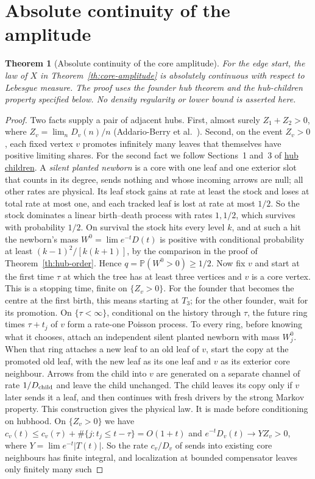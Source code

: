 \documentclass[11pt]{article}
\newcommand{\proofsrc}[2]{\href{https://github.com/uzay-eth/friend-tree-exponent/blob/a0972085ad72ad5685ae7b424988648d1965e73c/#1}{#2}}
\newtheorem{theorem}{Theorem}
\newcommand{\resulttag}{?}
\newcommand{\tagnext}[1]{\renewcommand{\resulttag}{#1}}
\theoremstyle{remark}
\numberwithin{equation}{section}
\newcommand{\Prob}{\mathbb P}
\begin{document}
\section{Absolute continuity of the amplitude}\label{sec:core-den}
\tagnext{DEN}
\begin{theorem}[Absolute continuity of the core amplitude]\label{th:core-density}
For the edge start, the law of $X$ in Theorem~\ref{th:core-amplitude} is absolutely continuous with respect to Lebesgue measure. The proof uses the founder hub theorem and the hub-children property specified below. No density regularity or lower bound is asserted here.
\end{theorem}
\begin{proof}
Two facts supply a pair of adjacent hubs. First, almost surely $Z_1+Z_2>0$, where $Z_v=\lim_n D_v(n)/n$ (Addario-Berry et al.~\cite[Theorem~3.2 at the founder edge, arXiv v1; see Theorem~3.1 for the degree limits]{AB}). Second, on the event $Z_v>0$, each fixed vertex $v$ promotes infinitely many leaves that themselves have positive limiting shares. For the second fact we follow Sections~1 and~3 of \proofsrc{round2/proofs/astra/source/round2/fringe/hub-children.md}{hub children}. A \emph{silent planted newborn} is a core with one leaf and one exterior slot that counts in its degree, sends nothing and whose incoming arrows are null; all other rates are physical. Its leaf stock gains at rate at least the stock and loses at total rate at most one, and each tracked leaf is lost at rate at most $1/2$. So the stock dominates a linear birth--death process with rates $1,1/2$, which survives with probability $1/2$. On survival the stock hits every level $k$, and at such a hit the newborn's mass $W^0=\lim e^{-t}D(t)$ is positive with conditional probability at least $(k-1)^2/[k(k+1)]$, by the comparison in the proof of Theorem~\ref{th:hub-order}. Hence $q=\Prob(W^0>0)\ge1/2$. Now fix $v$ and start at the first time $\tau$ at which the tree has at least three vertices and $v$ is a core vertex. This is a stopping time, finite on $\{Z_v>0\}$. For the founder that becomes the centre at the first birth, this means starting at $T_3$; for the other founder, wait for its promotion. On $\{\tau<\infty\}$, conditional on the history through $\tau$, the future ring times $\tau+t_j$ of $v$ form a rate-one Poisson process. To every ring, before knowing what it chooses, attach an independent silent planted newborn with mass $W^0_j$. When that ring attaches a new leaf to an old leaf of $v$, start the copy at the promoted old leaf, with the new leaf as its one leaf and $v$ as its exterior core neighbour. Arrows from the child into $v$ are generated on a separate channel of rate $1/D_{\rm child}$ and leave the child unchanged. The child leaves its copy only if $v$ later sends it a leaf, and then continues with fresh drivers by the strong Markov property. This construction gives the physical law. It is made before conditioning on hubhood. On $\{Z_v>0\}$ we have $c_v(t)\le c_v(\tau)+\#\{j:t_j\le t-\tau\}=O(1+t)$ and $e^{-t}D_v(t)\to YZ_v>0$, where $Y=\lim e^{-t}|T(t)|$. So the rate $c_v/D_v$ of sends into existing core neighbours has finite integral, and localization at bounded compensator leaves only finitely many such 
\end{proof}
\end{document}
